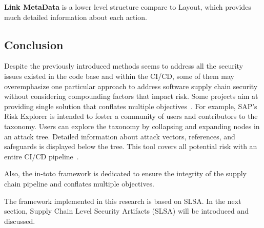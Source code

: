 \textbf{Link MetaData} is a lower level structure compare to Layout, which provides much detailed information about each action.
\subsection{Conclusion}
Despite the previously introduced methods seems to address all the security issues
existed in the code base and within the CI/CD, some of them may overemphasize one 
particular approach to address software supply chain security without considering 
compounding factors that impact risk.
Some projects aim at providing single solution that conﬂates multiple 
objectives~\cite{melara2022software}.
For example, SAP's Risk Explorer is intended to foster a community of users 
and contributors to the taxonomy. Users can explore the taxonomy by collapsing and expanding nodes in an attack tree. 
Detailed information about attack vectors, references, and safeguards is displayed below the tree.
This tool covers all potential risk with an entire CI/CD pipeline~\cite{ladisa2023journey}.

Also, the in-toto framework is dedicated to ensure the integrity of the supply chain pipeline and conflates multiple
objectives.

The framework implemented in this research is based on SLSA.
In the next section, Supply Chain Level Security Artifacts (SLSA) will be introduced and
discussed. 

